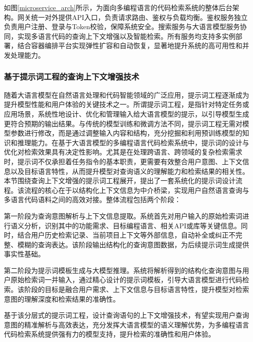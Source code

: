 \documentclass[UTF8,a4paper,12pt]{ctexart}
\numberwithin{equation}{section}
\begin{document}
如图\ref{microservice_arch}所示，为面向多编程语言的代码检索系统的整体后台架构。网关统一对外提供API入口，负责请求路由、鉴权与负载均衡。鉴权服务独立负责用户注册、登录与Token校验，保障系统安全。搜索服务与大语言模型服务协同，实现多语言代码的查询上下文增强以及智能检索。所有服务均支持多实例部署，结合容器编排平台实现弹性扩容和自动恢复，显著地提升系统的高可用性和并发处理能力。\par
\subsubsection{基于提示词工程的查询上下文增强技术}
随着大语言模型在自然语言处理和代码智能领域的广泛应用，提示词工程逐渐成为提升模型性能和用户体验的关键技术之一。所谓提示词工程，是指针对特定任务或应用场景，系统性地设计、优化和管理输入给大语言模型的提示，以引导模型生成更符合预期的输出结果。与传统的模型训练和微调方法不同，提示词工程无需对模型参数进行修改，而是通过调整输入内容和结构，充分挖掘和利用预训练模型的知识和推理能力。在基于大语言模型的多编程语言代码检索系统中，提示词的设计与优化对检索效果具有决定性影响。尤其是在处理跨语言、跨领域的复杂检索需求时，提示词不仅承担着任务指令的基本职责，更需要有效整合用户意图、上下文信息以及目标语言特性，从而提升模型对查询语义的理解能力和检索结果的相关性。本节围绕查询上下文增强的提示词工程展开，提出了一套系统化的提示词设计流程。该流程的核心在于以结构化上下文信息为中介桥梁，实现用户自然语言查询与多语言代码语料之间的高效对接。整体流程包括两个阶段：\par
第一阶段为查询意图解析与上下文信息提取。系统首先对用户输入的原始检索词进行语义分析，识别其中的功能需求、目标编程语言、相关API或库等关键信息。同时，结合用户历史检索记录、当前项目上下文等外部信息，自动补全或纠正不完整、模糊的查询表达。该阶段输出结构化的查询意图数据，为后续提示词生成提供事实性基础。\par
第二阶段为提示词模板生成与大模型推理。系统将解析得到的结构化查询意图与用户原始检索词一并输入，通过精心设计的提示词模板，引导大语言模型进行代码检索。该阶段的目标是融合用户需求、上下文信息与目标语言特性，提升模型对检索意图的理解深度和检索结果的准确性。\par
基于该分层式的提示词工程，设计查询语句的上下文增强技术，有望实现用户查询意图的精准解析与高效表达，充分发挥大语言模型的语义理解优势，为多编程语言代码检索系统提供强有力的模型支持，提升检索的准确性和用户体验。\par
\end{document}
